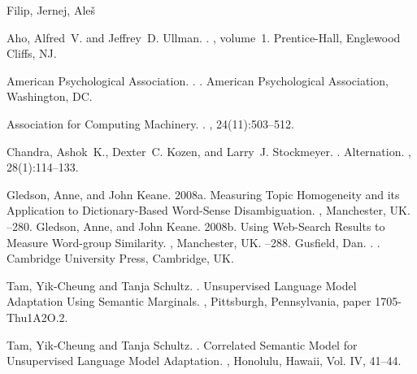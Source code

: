 \documentclass[11pt]{article}
\newcommand{\confname}{Machine Translation Summit XIV}
\begin{document}
Filip, Jernej, Ale\v{s}

% 

\begin{thebibliography}{}

Aho, Alfred~V. and Jeffrey~D. Ullman.
.
, volume~1.
\newblock Prentice-{Hall}, Englewood Cliffs, NJ.

{American Psychological Association}.
.
.
\newblock American Psychological Association, Washington, DC.

{Association for Computing Machinery}.
.
, 24(11):503--512.

Chandra, Ashok~K., Dexter~C. Kozen, and Larry~J. Stockmeyer.
.
\newblock Alternation.
,
  28(1):114--133.

Gledson, Anne, and John Keane. 
\newblock 2008a. 
\newblock Measuring Topic Homogeneity and its Application to Dictionary-Based Word-Sense Disambiguation. 
, Manchester, UK.
--280.
Gledson, Anne, and John Keane. 
\newblock 2008b. 
\newblock Using Web-Search Results to Measure Word-group Similarity. , Manchester, UK.
--288.
Gusfield, Dan.
.
.
\newblock Cambridge University Press, Cambridge, UK.

Tam, Yik-Cheung and Tanja Schultz.
. 
\newblock Unsupervised Language Model Adaptation Using
   Semantic Marginals.
, 
Pittsburgh, Pennsylvania, paper 1705-Thu1A2O.2. 

Tam, Yik-Cheung and Tanja Schultz.
.
\newblock Correlated  Semantic Model for
  Unsupervised Language Model Adaptation.
, Honolulu, Hawaii, Vol. IV, 41--44.

\end{thebibliography}
\end{document}
